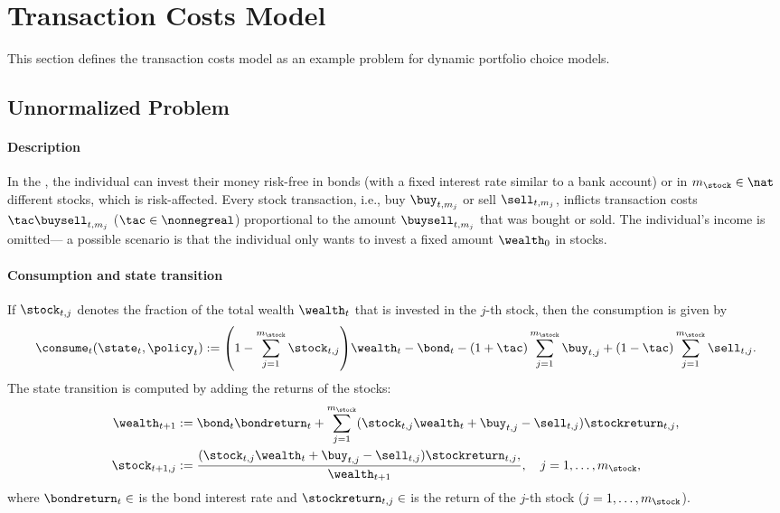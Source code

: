 \section{Transaction Costs Model}
\label{sec:83problem}


\noindent
This section defines the transaction costs model as an example problem for
dynamic portfolio choice models.



\subsection{Unnormalized Problem}

\paragraph{Description}

In the  \cite{Schober18Solving},
the individual can invest their money risk-free in bonds
(with a fixed interest rate similar to a bank account)
or in $m_{\stock} \in \nat$ different stocks, which is risk-affected.
Every stock transaction,
i.e., buy $\buy_{t,m_j}$ or sell $\sell_{t,m_j}$,
inflicts transaction costs $\tac \buysell_{t,m_j}$ ($\tac \in \nonnegreal$)
proportional to the amount $\buysell_{t,m_j}$ that was bought or sold.
The individual's income is omitted---%
a possible scenario is that the individual only wants to invest a fixed
amount $\wealth_0$ in stocks.

\paragraph{Consumption and state transition}

If $\stock_{t,j}$ denotes the fraction of the total wealth $\wealth_t$
that is invested in the $j$-th stock,
then the consumption is given by
\begin{equation}
  \consume_t(\state_t, \policy_t)
  := \paren*{1 - \sum_{j=1}^{m_{\stock}} \stock_{t,j}} \wealth_t - \bond_t -
  (1 + \tac) \sum_{j=1}^{m_{\stock}} \buy_{t,j} +
  (1 - \tac) \sum_{j=1}^{m_{\stock}} \sell_{t,j}.
\end{equation}
The state transition is computed by adding the returns of the stocks:
\begin{subequations}
  \begin{align}
    \wealth_{t+1}
    &:= \bond_t \bondreturn_t + \sum_{j=1}^{m_{\stock}}
    (\stock_{t,j} \wealth_t + \buy_{t,j} - \sell_{t,j}) \stockreturn_{t,j},\\
    \stock_{t+1,j}
    &:= \frac{
      (\stock_{t,j} \wealth_t + \buy_{t,j} - \sell_{t,j}) \stockreturn_{t,j},
    }{\wealth_{t+1}},\quad
    j = 1, \dotsc, m_{\stock},
  \end{align}
\end{subequations}
where $\bondreturn_t \in \real$ is the bond interest rate and
$\stockreturn_{t,j} \in \real$ is the return of the $j$-th stock
($j = 1, \dotsc, m_{\stock}$).



